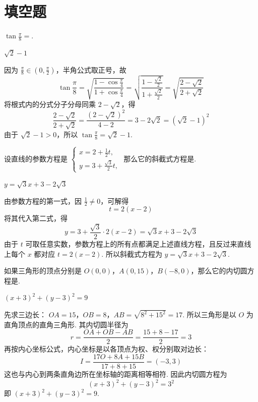 \documentclass[UTF8,a4paper,oneside,11pt]{ctexbook}
\begin{document}
\section{填空题}

\begin{problem}
\(\tan \frac{\pi}{8}=\)\fillinblank{}.
\end{problem}

\begin{answer}
\(\sqrt{2}-1\)
\end{answer}

\begin{solution}
因为 \(\frac\pi8\in(0,\frac\pi2)\)，半角公式取正号，故
\[
\tan\frac{\pi}{8}=\sqrt{\frac{1-\cos\frac{\pi}{4}}{1+\cos\frac{\pi}{4}}}
=\sqrt{\frac{1-\frac{\sqrt{2}}2}{1+\frac{\sqrt{2}}2}}
 =\sqrt{\frac{2-\sqrt2}{2+\sqrt2}}
\]
将根式内的分式分子分母同乘 \(2-\sqrt2\)，得
\[
\frac{2-\sqrt2}{2+\sqrt2}
=\frac{(2-\sqrt2)^2}{4-2}=3-2\sqrt2=(\sqrt2-1)^2
\]
由于 \(\sqrt2-1>0\)，所以 \(\tan\frac\pi8=\sqrt2-1\).
\end{solution}

\begin{problem}
设直线的参数方程是 \(\begin{cases}
x=2+\frac{1}{2}t,\\
y=3+\frac{\sqrt{3}}{2}t,
\end{cases}\) 那么它的斜截式方程是\fillinblank{}.
\end{problem}

\begin{answer}
\(y=\sqrt{3}x+3-2\sqrt{3}\)
\end{answer}

\begin{solution}
由参数方程的第一式，因 \(\frac12\ne0\)，可解得
\[
t=2(x-2)
\]
将其代入第二式，得
\[
y=3+\frac{\sqrt{3}}2\cdot2(x-2)=\sqrt{3}x+3-2\sqrt{3}
\]
由于 \(t\) 可取任意实数，参数方程上的所有点都满足上述直线方程，且反过来直线上每个 \(x\) 都对应 \(t=2(x-2)\). 所以斜截式方程为 \(y=\sqrt{3}x+3-2\sqrt{3}\).
\end{solution}

\begin{problem}
如果三角形的顶点分别是 \(O(0,0)\)，\(A(0,15)\)，\(B(-8,0)\)，那么它的内切圆方程是\fillinblank{}.
\end{problem}

\begin{answer}
\((x+3)^2+(y-3)^2=9\)
\end{answer}

\begin{solution}
先求三边长：
\(OA=15\)，\(OB=8\)，\(AB=\sqrt{8^2+15^2}=17\).
所以三角形是以 \(O\) 为直角顶点的直角三角形. 其内切圆半径为
\[
r=\frac{OA+OB-AB}{2}=\frac{15+8-17}{2}=3
\]
再按内心坐标公式，内心坐标是以各顶点为权、权分别取对边长：
\[
I=\frac{17O+8A+15B}{17+8+15}=(-3,3)
\]
这也与内心到两条直角边所在坐标轴的距离相等相符. 因此内切圆方程为
\[
(x+3)^2+(y-3)^2=3^2
\]
即 \((x+3)^2+(y-3)^2=9\).
\end{solution}
\end{document}
